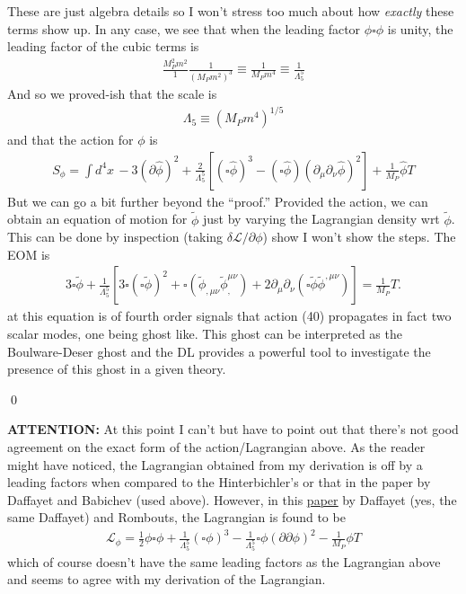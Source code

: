 \documentclass{book}
\theoremstyle{definition}
\newcommand{\p}{\partial}
\newcommand{\lag}{\mathcal{L}}
\newcommand{\f}[2]{\frac{#1}{#2}}
\newcommand{\lp}{\left(}
\newcommand{\rp}{\right)}
\newcommand{\lb}{\left[}
\newcommand{\rb}{\right]}
\begin{document}
\begin{framed}
	These are just algebra details so I won't stress too much about how \textit{exactly} these terms show up. In any case, we see that when the leading factor $\phi \square \phi$ is unity, the leading factor of the cubic terms is
	\begin{align}
	\boxed{\f{M_P^2 m^2}{1} \f{1}{(M_P m^2)^3} \equiv \f{1}{M_P m^4} \equiv \f{1}{\Lambda_5^5}}
	\end{align}
	And so we proved-ish that the scale is 
	\begin{align}
	\boxed{\Lambda_5 \equiv (M_P m^4)^{1/5}}
	\end{align}
	and that the action for $\phi$ is 
	\begin{align}
	\boxed{S_\phi = \int d^4x\, -3(\p \hat{\phi})^2 + \f{2}{\Lambda_5^5}[(\square \hat\phi)^3 - (\square \hat\phi)(\p_\mu \p_\nu \hat\phi)^2] + \f{1}{M_P}\hat\phi T}
	\end{align}
	But we can go a bit further beyond the ``proof.'' Provided the action, we can obtain an equation of motion for $\tilde\phi$ just by varying the Lagrangian density wrt $\tilde\phi$. This can be done by inspection (taking $\delta \lag / \p \phi$) show I won't show the steps. The EOM is 
	\begin{align}
	3\square \tilde\phi + \f{1}{\Lambda_5^5} \lb 3\square(\square \tilde\phi)^2 + \square \lp \tilde\phi_{,\mu\nu} \tilde\phi_,^{\mu\nu}\rp + 2\p_\mu \p_\nu (\square \tilde\phi \tilde\phi^{,\mu\nu}) \rb = \f{1}{M_P}T.
	\end{align}
	at this equation is of fourth order signals that
	action (40) propagates in fact two scalar modes, one being ghost like. This ghost can be interpreted as the Boulware-Deser ghost and the DL provides a powerful tool to investigate the presence of this ghost in a given theory.
	
	
	
	\qed
\end{framed}



\textbf{ATTENTION:} At this point I can't but have to point out that there's not good agreement on the exact form of the action/Lagrangian above. As the reader might have noticed, the Lagrangian obtained from my derivation is off by a leading factors when compared to the Hinterbichler's or that in the paper by Daffayet and Babichev (used above). However, in this \href{https://journals.aps.org/prd/pdf/10.1103/PhysRevD.72.044003}{\underline{paper}} by Daffayet (yes, the same Daffayet) and Rombouts, the Lagrangian is found to be
\begin{align}
\boxed{\lag_\phi = \f{1}{2}\phi\square \phi + \f{1}{\Lambda_5^5} (\square \phi)^3 - \f{1}{\Lambda_5^5} \square \phi (\p \p \phi)^2 - \f{1}{M_P}\phi T}
\end{align}
which of course doesn't have the same leading factors as the Lagrangian above and seems to agree with my derivation of the Lagrangian. \\
\end{document}
